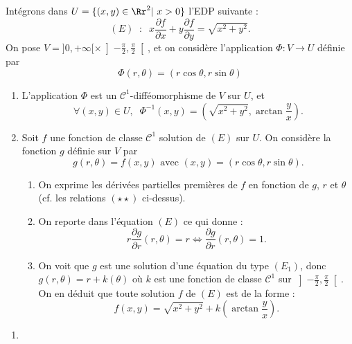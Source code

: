 \documentclass[11pt, class=report,crop=false]{standalone}
\begin{document}
Intégrons dans $U=\{(x,y)\in \Rr^2|\ x>0\}$ l'EDP suivante :
$$(E)\;\; :\; \; x\frac{\partial f}{\partial x}+y\frac{\partial f}{\partial y}=\sqrt{x^2+y^2}.$$
\rm On pose $\displaystyle V=]0,+\infty [\times \left]-\frac{\pi}{2},\frac{\pi}{2}\right[$, et on considère l'application $\Phi : V\to U$ définie par
$$\Phi (r,\theta )=(r\cos \theta,r\sin \theta )$$
\begin{enumerate}
\item L'application $\Phi$ est un ${\mathscr C}^1$-difféomorphisme de $V$ sur $U$, et
$$\forall (x,y)\in U,\; \;\Phi ^{-1}(x,y)=\left( \sqrt{x^2+y^2},\arctan\frac{y}{x}\right).$$
\item Soit $f$ une fonction de classe ${\mathscr C}^1$ solution de $(E)$ sur $U$. On considère la fonction $g$ définie sur $V$ par
$$g(r,\theta )=f(x,y)\mbox{ avec }(x,y)=(r\cos \theta,r\sin \theta ).$$
\begin{enumerate}
\item On exprime les dérivées partielles premières de $f$ en fonction de $g$, $r$ et $\theta$ (cf. les relations $(\star \star )$ ci-dessus).
\item On reporte dans l'équation $(E)$ ce qui donne :
$$r\frac{\partial g}{\partial r}(r,\theta )=r\Leftrightarrow \frac{\partial g}{\partial r}(r,\theta )=1.$$
\item On voit que $g$ est une solution d'une équation du type $(E_1)$, donc $g(r,\theta )=r+k(\theta )$ o\`u $k$ est une fonction de classe ${\mathscr C}^1$ sur $\displaystyle \left]-\frac{\pi}{2},\frac{\pi}{2}\right[$. On en déduit que toute solution $f$ de $(E)$ est de la forme :
$$\displaystyle f(x,y)=\sqrt{x^2+y^2}+k\left(\arctan \frac{y}{x}\right).$$
\end{enumerate}                 
\end{enumerate}


\begin{miniexercices}
\sauteligne
\begin{enumerate}
  \item 
\end{enumerate}
\end{miniexercices}



\auteurs{
}

\finchapitre 
\end{document}
